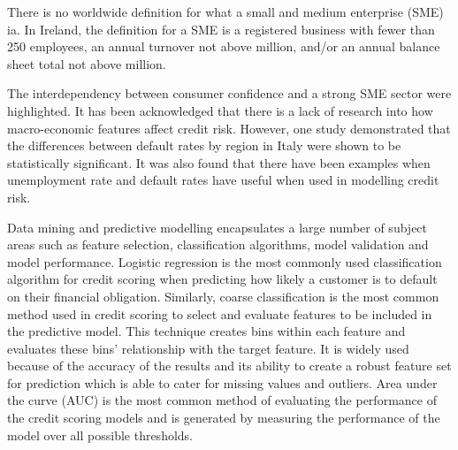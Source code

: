 There is no worldwide definition for what a small and medium enterprise (SME) ia. In Ireland, the definition for a SME is a registered business with fewer than 250 employees, an annual turnover not above  million, and/or an annual balance sheet total not above  million.

The interdependency between consumer confidence and a strong SME sector were
highlighted. It has been acknowledged that there is a lack of research into how macro-economic features affect credit risk. However, one study demonstrated that the differences between default rates by region in Italy were shown to be statistically significant. It was also found that there have been examples when unemployment rate and default rates have useful when used in modelling credit risk.

Data mining and predictive modelling encapsulates a large number of subject areas such as feature selection, classification algorithms, model validation and model performance. Logistic regression is the most commonly used classification algorithm for credit scoring when predicting how likely a customer is to default on their financial obligation. Similarly, coarse classification is the most common method used in credit scoring to select and evaluate features to be included in the predictive model. This technique creates bins within each feature and evaluates these bins' relationship with the target feature. It is widely used because of the accuracy of the results and its ability to create a robust feature set for prediction which is able to cater for missing values and outliers. Area under the curve (AUC) is the most common method of evaluating the performance of the credit scoring models and is generated by measuring the performance of the model over all possible thresholds.

